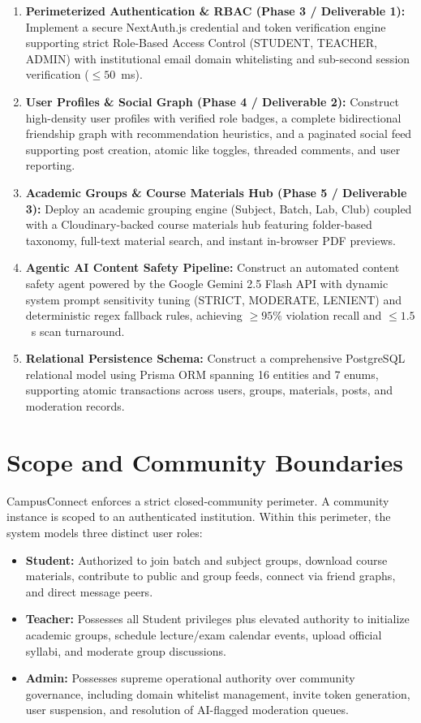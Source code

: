 \documentclass[11pt,a4paper]{report}
\begin{document}
\begin{enumerate}
    \item \textbf{Perimeterized Authentication \& RBAC (Phase 3 / Deliverable 1):} Implement a secure NextAuth.js credential and token verification engine supporting strict Role-Based Access Control (STUDENT, TEACHER, ADMIN) with institutional email domain whitelisting and sub-second session verification ($\leq 50$~ms).
    \item \textbf{User Profiles \& Social Graph (Phase 4 / Deliverable 2):} Construct high-density user profiles with verified role badges, a complete bidirectional friendship graph with recommendation heuristics, and a paginated social feed supporting post creation, atomic like toggles, threaded comments, and user reporting.
    \item \textbf{Academic Groups \& Course Materials Hub (Phase 5 / Deliverable 3):} Deploy an academic grouping engine (Subject, Batch, Lab, Club) coupled with a Cloudinary-backed course materials hub featuring folder-based taxonomy, full-text material search, and instant in-browser PDF previews.
    \item \textbf{Agentic AI Content Safety Pipeline:} Construct an automated content safety agent powered by the Google Gemini 2.5 Flash API with dynamic system prompt sensitivity tuning (STRICT, MODERATE, LENIENT) and deterministic regex fallback rules, achieving $\geq 95\%$ violation recall and $\leq 1.5$~s scan turnaround.
    \item \textbf{Relational Persistence Schema:} Construct a comprehensive PostgreSQL relational model using Prisma ORM spanning 16 entities and 7 enums, supporting atomic transactions across users, groups, materials, posts, and moderation records.
\end{enumerate}

\section{Scope and Community Boundaries}

CampusConnect enforces a strict closed-community perimeter. A community instance is scoped to an authenticated institution. Within this perimeter, the system models three distinct user roles:

\begin{itemize}
    \item \textbf{Student:} Authorized to join batch and subject groups, download course materials, contribute to public and group feeds, connect via friend graphs, and direct message peers.
    \item \textbf{Teacher:} Possesses all Student privileges plus elevated authority to initialize academic groups, schedule lecture/exam calendar events, upload official syllabi, and moderate group discussions.
    \item \textbf{Admin:} Possesses supreme operational authority over community governance, including domain whitelist management, invite token generation, user suspension, and resolution of AI-flagged moderation queues.
\end{itemize}
\end{document}
